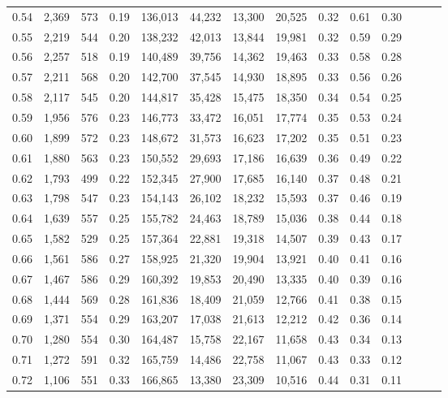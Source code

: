 \begin{tabular}{rrrrrrrrrrrrrr}
0.54 &  2,369 &  573 &  0.19 &  136,013 &   44,232 &  13,300 &  20,525 &  0.32 &  0.61 &      0.30 \\
0.55 &  2,219 &  544 &  0.20 &  138,232 &   42,013 &  13,844 &  19,981 &  0.32 &  0.59 &      0.29 \\
0.56 &  2,257 &  518 &  0.19 &  140,489 &   39,756 &  14,362 &  19,463 &  0.33 &  0.58 &      0.28 \\
0.57 &  2,211 &  568 &  0.20 &  142,700 &   37,545 &  14,930 &  18,895 &  0.33 &  0.56 &      0.26 \\
0.58 &  2,117 &  545 &  0.20 &  144,817 &   35,428 &  15,475 &  18,350 &  0.34 &  0.54 &      0.25 \\
0.59 &  1,956 &  576 &  0.23 &  146,773 &   33,472 &  16,051 &  17,774 &  0.35 &  0.53 &      0.24 \\
0.60 &  1,899 &  572 &  0.23 &  148,672 &   31,573 &  16,623 &  17,202 &  0.35 &  0.51 &      0.23 \\
0.61 &  1,880 &  563 &  0.23 &  150,552 &   29,693 &  17,186 &  16,639 &  0.36 &  0.49 &      0.22 \\
0.62 &  1,793 &  499 &  0.22 &  152,345 &   27,900 &  17,685 &  16,140 &  0.37 &  0.48 &      0.21 \\
0.63 &  1,798 &  547 &  0.23 &  154,143 &   26,102 &  18,232 &  15,593 &  0.37 &  0.46 &      0.19 \\
0.64 &  1,639 &  557 &  0.25 &  155,782 &   24,463 &  18,789 &  15,036 &  0.38 &  0.44 &      0.18 \\
0.65 &  1,582 &  529 &  0.25 &  157,364 &   22,881 &  19,318 &  14,507 &  0.39 &  0.43 &      0.17 \\
0.66 &  1,561 &  586 &  0.27 &  158,925 &   21,320 &  19,904 &  13,921 &  0.40 &  0.41 &      0.16 \\
0.67 &  1,467 &  586 &  0.29 &  160,392 &   19,853 &  20,490 &  13,335 &  0.40 &  0.39 &      0.16 \\
0.68 &  1,444 &  569 &  0.28 &  161,836 &   18,409 &  21,059 &  12,766 &  0.41 &  0.38 &      0.15 \\
0.69 &  1,371 &  554 &  0.29 &  163,207 &   17,038 &  21,613 &  12,212 &  0.42 &  0.36 &      0.14 \\
0.70 &  1,280 &  554 &  0.30 &  164,487 &   15,758 &  22,167 &  11,658 &  0.43 &  0.34 &      0.13 \\
0.71 &  1,272 &  591 &  0.32 &  165,759 &   14,486 &  22,758 &  11,067 &  0.43 &  0.33 &      0.12 \\
0.72 &  1,106 &  551 &  0.33 &  166,865 &   13,380 &  23,309 &  10,516 &  0.44 &  0.31 &      0.11 \\

\end{tabular}
